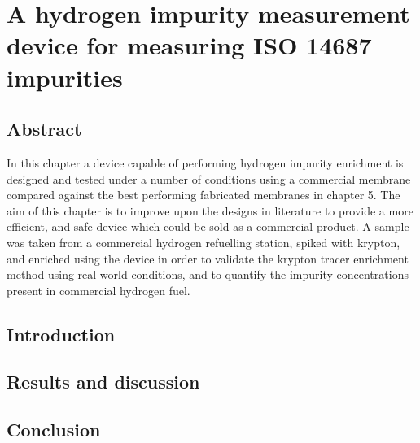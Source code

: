 \chapter{A hydrogen impurity measurement device for measuring ISO 14687 impurities}

\section{Abstract}
In this chapter a device capable of performing hydrogen impurity enrichment is designed and tested under a number of conditions using a commercial membrane compared against the best performing fabricated membranes in chapter 5. The aim of this chapter is to improve upon the designs in literature to provide a more efficient, and safe device which could be sold as a commercial product. A sample was taken from a commercial hydrogen refuelling station, spiked with krypton, and enriched using the device in order to validate the krypton tracer enrichment method using real world conditions, and to quantify the impurity concentrations present in commercial hydrogen fuel. 

\section{Introduction}

\section{Results and discussion}

\section{Conclusion}
% 
% 
